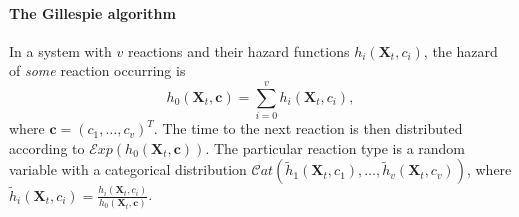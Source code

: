 \paragraph{The Gillespie algorithm}
In a system with $v$ reactions and their hazard functions $h_i(\bm{X}_t, c_i)$, the hazard of \emph{some} reaction occurring is
\begin{equation*}
h_0(\bm{X}_t, \bm{c}) = \sum_{i=0}^v h_i(\bm{X}_t, c_i),
\end{equation*}
where $\bm{c} = \left(c_1, \ldots, c_v\right)^T$. The time to the next reaction is then distributed according to $\mathcal{E}\mathit{xp}\left(h_0(\bm{X}_t, \bm{c})\right)$. The particular reaction type is a random variable with a categorical distribution $\mathcal{C}\mathit{at}\left(\widetilde{h}_1(\bm{X}_t,c_1), \ldots, \widetilde{h}_v(\bm{X}_t,c_v)\right)$, where $\displaystyle \widetilde{h}_i(\bm{X}_t,c_i) = \frac{h_i(\bm{X}_t,c_i)}{h_0(\bm{X}_t, \bm{c})}$.

